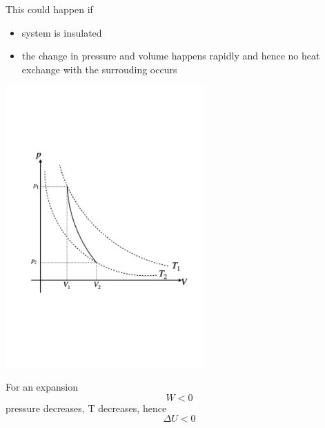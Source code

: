 \documentclass[a4paper, 10pt]{article}
\begin{document}
This could happen if 
\begin{itemize}
   \item system is insulated
   \item the change in pressure and volume happens rapidly and hence no heat exchange with the surrouding occurs
\end{itemize} 
\begin{minipage}{0.5\textwidth}
   \includegraphics[trim = 50 50 50 50, width=3in]{figures/adiabetic_process.pdf} 
\end{minipage}	
\begin{minipage}{0.5\textwidth}
   For an expansion
   \[
   W < 0
   \]
   pressure decreases, 
   T decreases, hence
   \[
   \Delta U < 0
   \]
\end{minipage}	
\end{document}
